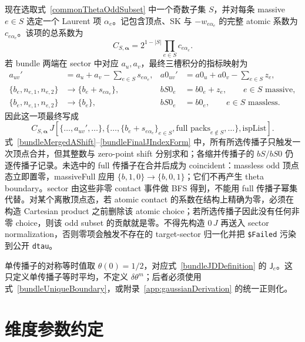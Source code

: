 ﻿\documentclass[a4paper,11pt]{article}
\begin{document}
现在选取式~\eqref{commonThetaOddSubset} 中一个奇数子集 $S$，并对每条 massive $e\in S$ 选定一个 Laurent 项 $\alpha_e$。记包含顶点、SK 与 $-w_{e\alpha_e}$ 的完整 atomic 系数为 $c_{e\alpha_e}$。该项的总系数为
\begin{equation}
 C_{S,\boldsymbol\alpha}
 =2^{1-|S|}\prod_{e\in S}c_{e\alpha_e}.
 \label{bundleIndexCoefficient}
\end{equation}
若 bundle 两端在 sector 中对应 $a_u,a_v$，最终三槽积分的指标映射为
\begin{align}
 a_{uv}'&=a_u+a_v-\sum_{e\in S}s_{e\alpha_e},
 &
 a0_{uv}'&=a0_u+a0_v-\sum_{e\in S}z_e,
 \label{bundleMergedAShift}\\
 \{b_e,n_{e,1},n_{e,2}\}&\longrightarrow\{b_e+s_{e\alpha_e}\},
 &
 bS0_e&=b0_e+z_e,
 \qquad e\in S\text{ massive},
 \label{bundleMassivePackShift}\\
 \{b_e,n_{e,1},n_{e,2}\}&\longrightarrow\{b_e\},
 &
 bS0_e&=b0_e,
 \qquad e\in S\text{ massless}.
 \label{bundleMasslessPackShift}
\end{align}
因此这一项最终写成
\begin{equation}
 C_{S,\boldsymbol\alpha}\,
 J\!\left[
  \{\ldots,a_{uv}',\ldots\},
  \{\ldots,\{b_e+s_{e\alpha_e}\}_{e\in S},
          \text{full packs}_{e\notin S},\ldots\},
  \mathrm{ispList}
 \right].
 \label{bundleFinalJIndexForm}
\end{equation}
式~\eqref{bundleMergedAShift}--\eqref{bundleFinalJIndexForm} 中，所有所选传播子只触发一次顶点合并，但其整数与 zero-point shift 分别求和；各缩并传播子的 $bS/bS0$ 仍逐传播子记录。未选中的 full 传播子在合并后成为 coincident：massless odd 顶点态立即置零，massiveFull 应用 $\{b,1,0\}\to\{b,0,1\}$；它们不再产生 theta boundary。sector 由这些非零 contact 事件做 BFS 得到，不能用 full 传播子幂集代替。对某个离散顶点态，若 atomic contact 的系数在结构上精确为零，必须在构造 Cartesian product 之前删除该 atomic choice；若所选传播子因此没有任何非零 choice，则该 odd subset 的贡献就是零。不得先构造 $0\,J$ 再送入 sector normalization，否则零项会触发不存在的 target-sector 归一化并把 \texttt{\$Failed} 污染到公开 \texttt{dtau}。

单传播子的对称等时值取 $\theta(0)=1/2$，对应式~\eqref{bundleJDDefinition} 的 $\mathsf J_e$。这只定义单传播子等时平均，不定义 $\delta\theta^m$；后者必须使用式~\eqref{bundleUniqueBoundary}，或附录~\ref{app:gaussianDerivation} 的统一正则化。
\section{维度参数约定}
\end{document}

